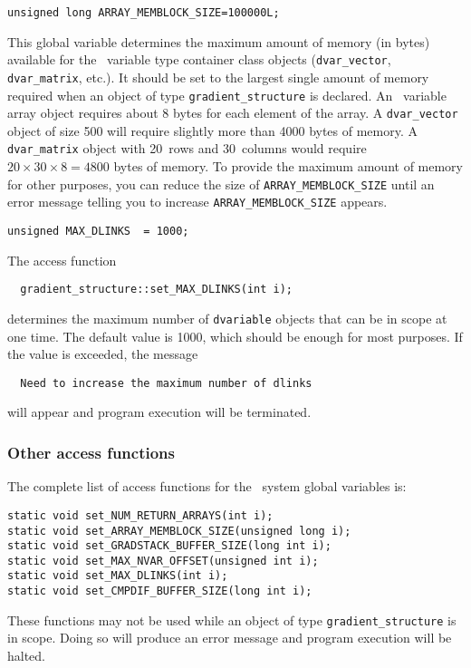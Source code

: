 \documentclass{admbmanual}
\begin{document}
\bigskip
{}
\begin{lstlisting}
unsigned long ARRAY_MEMBLOCK_SIZE=100000L;  
\end{lstlisting}  
This  global variable determines the maximum amount of memory (in bytes)
available for the \scAD\ variable type container class objects (\texttt{dvar\_vector},
\texttt{dvar\_matrix}, etc.). It should be set to the largest
single amount of memory required when an object of
type \texttt{gradient\_structure} is declared. An \scAD\ variable array object
requires about 8 bytes for each element of the array. A
\texttt{dvar\_vector} object of size 500 will require slightly more than
4000 bytes of memory. A \texttt{dvar\_matrix} object with 20~rows and 
30~columns would require $ 20 \times 30 \times 8 = 4800$ bytes of memory.
To provide the maximum amount of memory for other purposes, you can
reduce the size of 
\texttt{ARRAY\_MEMBLOCK\_SIZE} until an error message
telling you to increase  \texttt{ARRAY\_MEMBLOCK\_SIZE} appears. 



\begin{lstlisting}
unsigned MAX_DLINKS  = 1000; 
\end{lstlisting}
The access function
\begin{lstlisting}
  gradient_structure::set_MAX_DLINKS(int i);
\end{lstlisting}
determines the maximum number of \texttt{dvariable} objects
that can be in scope at one time. The default value is 1000,
which should be enough for most purposes. If the value is
exceeded, the message 
\begin{lstlisting}
  Need to increase the maximum number of dlinks
\end{lstlisting}
will appear and program execution will be terminated.


\subsubsection{Other access functions}

The complete list of access functions for the \scAD\ system global variables is:
\begin{lstlisting}
static void set_NUM_RETURN_ARRAYS(int i);
static void set_ARRAY_MEMBLOCK_SIZE(unsigned long i);
static void set_GRADSTACK_BUFFER_SIZE(long int i);
static void set_MAX_NVAR_OFFSET(unsigned int i);
static void set_MAX_DLINKS(int i);
static void set_CMPDIF_BUFFER_SIZE(long int i);
\end{lstlisting}
These functions may not be used while an object of
type \texttt{gradient\_structure} is in scope. Doing so
will produce an error message and program execution will be halted.
\end{document}
